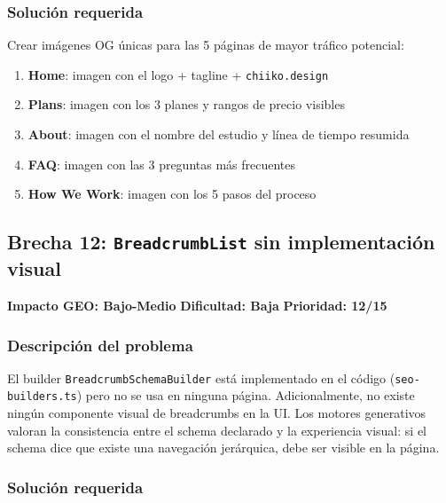 \documentclass[12pt, a4paper]{article}
\begin{document}
\subsubsection{Solución requerida}

Crear imágenes OG únicas para las 5 páginas de mayor tráfico potencial:
\begin{enumerate}[itemsep=3pt]
  \item \textbf{Home}: imagen con el logo + tagline + \texttt{chiiko.design}
  \item \textbf{Plans}: imagen con los 3 planes y rangos de precio visibles
  \item \textbf{About}: imagen con el nombre del estudio y línea de tiempo resumida
  \item \textbf{FAQ}: imagen con las 3 preguntas más frecuentes
  \item \textbf{How We Work}: imagen con los 5 pasos del proceso
\end{enumerate}

\subsection{Brecha 12: \texttt{BreadcrumbList} sin implementación visual}

\begin{medbox}
\textbf{Impacto GEO: Bajo-Medio} \quad \textbf{Dificultad: Baja} \quad \textbf{Prioridad: 12/15}
\end{medbox}

\subsubsection{Descripción del problema}

El builder \texttt{BreadcrumbSchemaBuilder} está implementado en el código (\texttt{seo-builders.ts}) pero no se usa en ninguna página. Adicionalmente, no existe ningún componente visual de breadcrumbs en la UI. Los motores generativos valoran la consistencia entre el schema declarado y la experiencia visual: si el schema dice que existe una navegación jerárquica, debe ser visible en la página.

\subsubsection{Solución requerida}
\end{document}
